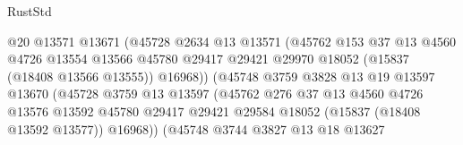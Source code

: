 \begin{lexlean}{RustStd}
\begin{coremodule}
                                      @20
                                      @13571
                                      @13671
                                      (@45728
                                        @2634
                                        @13
                                        @13571
                                        (@45762
                                          @153
                                          @37
                                          @13
                                          @4560
                                          @4726
                                          @13554
                                          @13566
                                          @45780
                                          @29417
                                          @29421
                                          @29970
                                          @18052
                                          (@15837 (@18408 @13566 @13555))
                                          @16968))
                                      (@45748
                                        @3759
                                        @3828
                                        @13
                                        @19
                                        @13597
                                        @13670
                                        (@45728
                                          @3759
                                          @13
                                          @13597
                                          (@45762
                                            @276
                                            @37
                                            @13
                                            @4560
                                            @4726
                                            @13576
                                            @13592
                                            @45780
                                            @29417
                                            @29421
                                            @29584
                                            @18052
                                            (@15837 (@18408 @13592 @13577))
                                            @16968))
                                        (@45748
                                          @3744
                                          @3827
                                          @13
                                          @18
                                          @13627

\end{coremodule}
\end{lexlean}
